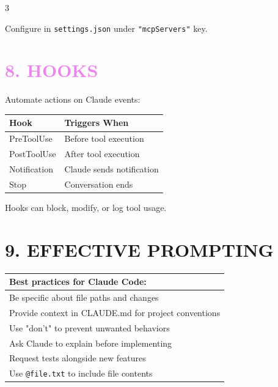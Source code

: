 \documentclass[landscape,11pt]{article}
\begin{document}
\begin{multicols}{3}
\vspace{2mm}
\begin{tcolorbox}[colback=Cerulean!8, colframe=Cerulean, boxsep=2pt, arc=1pt, fontupper=\small]
Configure in \texttt{settings.json} under \texttt{"mcpServers"} key.
\end{tcolorbox}

\section*{\textcolor{Violet}{8. HOOKS}}
Automate actions on Claude events:

\renewcommand{\arraystretch}{1.15}
\begin{tabularx}{\linewidth}{@{}>{\ttfamily\small}l>{\raggedright\arraybackslash}X@{}}
\normalfont\textbf{Hook} & \textbf{Triggers When}\\
\hline
PreToolUse & Before tool execution\\
PostToolUse & After tool execution\\
Notification & Claude sends notification\\
Stop & Conversation ends\\
\end{tabularx}
\renewcommand{\arraystretch}{1}

\vspace{2mm}
\begin{tcolorbox}[colback=Violet!8, colframe=Violet, boxsep=2pt, arc=1pt, fontupper=\small\itshape]
Hooks can block, modify, or log tool usage.
\end{tcolorbox}

\section*{\textcolor{OliveGreen}{9. EFFECTIVE PROMPTING}}
\renewcommand{\arraystretch}{1.15}
\begin{tabularx}{\linewidth}{@{}>{\raggedright\arraybackslash}X@{}}
\textbf{Best practices for Claude Code:}\\
\hline
Be specific about file paths and changes\\
Provide context in CLAUDE.md for project conventions\\
Use "don't" to prevent unwanted behaviors\\
Ask Claude to explain before implementing\\
Request tests alongside new features\\
Use \texttt{@file.txt} to include file contents\\
\end{tabularx}
\renewcommand{\arraystretch}{1}


\end{multicols}
\end{document}
